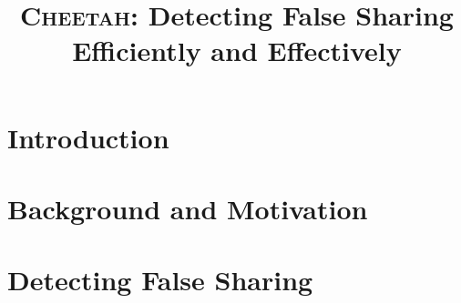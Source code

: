 \documentclass{sig-alternate}
\date{} %
\newcommand{\punt}[1]{}
\newcommand{\Cheetah}{{\scshape Cheetah}}
\begin{document}

\title{{\huge \bf \Cheetah{}}: Detecting False Sharing Efficiently and Effectively}



\maketitle

\begin{abstract}


\end{abstract}



\punt{
\category{D.1.3}{Programming Techniques}{Concurrent Programming--Parallel Programming}
\category{D.2.5}{Software Engineering}{Testing and Debugging--Debugging Aids}

\terms
Design, Reliability, Performance

\keywords
False Sharing, Detection Tools, Performance 
}



\section{Introduction}


\section{Background and Motivation}



\section{Detecting False Sharing}

\end{document}
